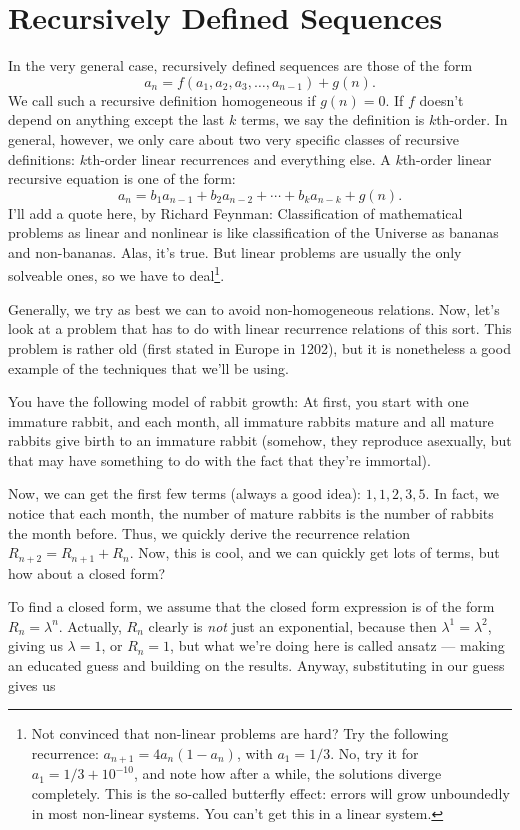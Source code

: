 \documentclass[12pt,letterpaper]{article}
\begin{document}
\section{Recursively Defined Sequences}
In the very general case, recursively defined sequences are those of
the form $$a_n = f(a_1, a_2, a_3, \dots, a_{n-1}) + g(n).$$ We call such a
recursive definition homogeneous if $g(n) = 0$. If $f$ doesn't depend
on anything except the last $k$ terms, we say the definition is
$k$th-order. In general, however, we only care about two very
specific classes of recursive definitions: $k$th-order linear recurrences and
everything else. A $k$th-order linear recursive equation is one of
the form:
$$a_n = b_1 a_{n-1} + b_2 a_{n-2} + \cdots + b_k a_{n - k} + g(n).$$
I'll add a quote here, by Richard Feynman: Classification of mathematical
problems as linear and nonlinear is like classification of the Universe as
bananas and non-bananas. Alas, it's true. But linear problems are usually the
only solveable ones, so we have to deal\footnote{Not convinced that non-linear
problems are hard? Try the following recurrence: $a_{n+1} = 4a_n(1-a_n)$, with
$a_1 = 1/3$. No, try it for $a_1 = 1/3 + 10^{-10}$, and note how after a while,
the solutions diverge completely. This is the so-called butterfly effect: errors
will grow unboundedly in most non-linear systems. You can't get this in a linear
system.}.

Generally, we try as best we can to avoid non-homogeneous
relations. Now, let's look at a problem that has to do with linear
recurrence relations of this sort. This problem is rather old (first stated
in Europe in 1202), but it is nonetheless a
good example of the techniques that we'll be using.

You have the following model of rabbit growth: At first, you start
with one immature rabbit, and each month, all immature rabbits mature
and all mature rabbits give birth to an immature rabbit (somehow, they
reproduce asexually, but that may have something to do with the fact
that they're immortal).

Now, we can get the first few terms (always a good idea): $1, 1, 2, 3,
5$.  In fact, we notice that each month, the number of mature rabbits
is the number of rabbits the month before. Thus, we quickly derive the
recurrence relation $R_{n+2} = R_{n+1} + R_n$. Now, this is cool, and
we can quickly get lots of terms, but how about a closed form?

To find a closed form, we assume that the closed form expression is of the
form $R_n = \lambda^n$. Actually, $R_n$ clearly is \emph{not} just an exponential,
because then $\lambda^1 = \lambda^2$, giving us $\lambda=1$, or $R_n=1$, but
what we're doing here is called ansatz --- making an educated guess and building
on the results. Anyway, substituting in our guess gives us
\end{document}
